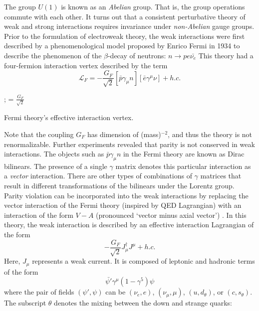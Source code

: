 The group $U(1)$ is known as an \emph{Abelian} group. That is, the group operations commute with each other. It turns out that a consistent perturbative theory of weak and strong interactions requires invariance under \emph{non-Abelian} gauge groups. Prior to the formulation of electroweak theory, the weak interactions were first described by a phenomenological model proposed by Enrico Fermi in 1934 \citep{Fermi:1934sk,Fermi:1934hr} to describe the phenomenon of the $\beta$-decay of neutrons: $n\rightarrow p e \bar{\nu_e}$ This theory had a four-fermion interaction vertex described by the term
\begin{equation}
\mathcal{L}_F = -\frac{G_F}{\sqrt{2}}\left[\bar{p}\gamma_\mu n\right]\left[\bar{e}\gamma^\mu\nu\right] + h.c.
\end{equation}
\begin{marginfigure}[-1cm]
;
= $\frac{G_F}{\sqrt{2}}$
\caption{Fermi theory's effective interaction vertex.}
\end{marginfigure}
Note that the coupling $G_F$ has dimension of (mass)$^{-2}$, and thus the theory is not renormalizable. Further experiments \citep{Wu:1957my} revealed that parity is not conserved in weak interactions. The objects such as $\bar{p}\gamma_\mu n$ in the Fermi theory are known as Dirac bilinears. The presence of a single $\gamma$ matrix denotes this particular interaction as a \emph{vector} interaction. There are other types of combinations of $\gamma$ matrices that result in different transformations of the bilinears under the Lorentz group. Parity violation can be incorporated into the weak interactions by replacing the vector interaction of the Fermi theory (inspired by QED Lagrangian)  with an interaction of the form $V-A$ (pronounced `vector minus axial vector') \citep{Lesov2009}. In this theory, the weak interaction is described by an effective interaction Lagrangian of the form
\begin{equation}
-\frac{G_F}{\sqrt{2}}J^\dagger_\mu J^\mu + h.c.
\end{equation}
Here, $J_\mu$ represents a weak current. It is composed of leptonic and hadronic terms of the form 
\begin{equation}\label{eq:v_a_interaction}
\bar{\psi'}\gamma^\mu(1-\gamma^5)\psi
\end{equation}
where the pair of fields $(\psi', \psi)$ can be $(\nu_e, e)$, $(\nu_\mu,\mu)$, $(u, d_\theta)$, or $(c, s_\theta)$. The subscript $\theta$ denotes the mixing between the down and strange quarks: 
